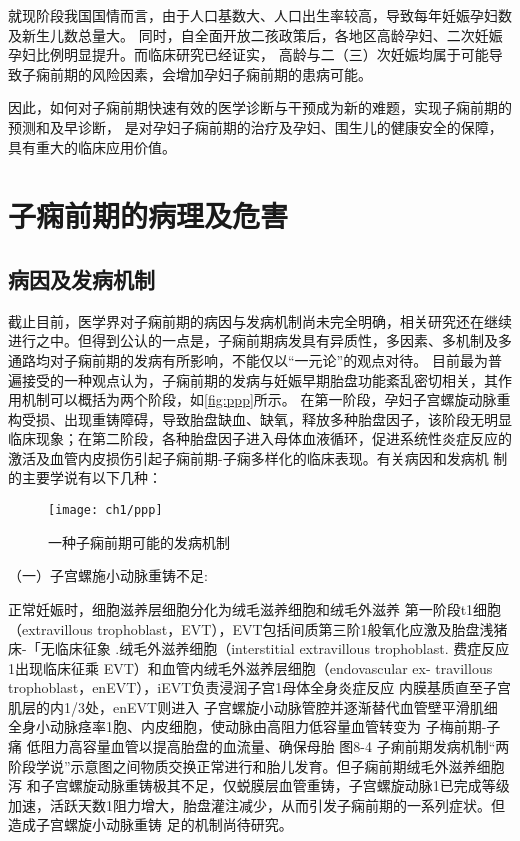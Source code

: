 就现阶段我国国情而言，由于人口基数大、人口出生率较高，导致每年妊娠孕妇数及新生儿数总量大。
同时，自全面开放二孩政策后，各地区高龄孕妇、二次妊娠孕妇比例明显提升。而临床研究已经证实，
高龄与二（三）次妊娠均属于可能导致子痫前期的风险因素，会增加孕妇子痫前期的患病可能。

因此，如何对子痫前期快速有效的医学诊断与干预成为新的难题，实现子痫前期的预测和及早诊断，
是对孕妇子痫前期的治疗及孕妇、围生儿的健康安全的保障，具有重大的临床应用价值。
\section{子痫前期的病理及危害}
\subsection{病因及发病机制}
截止目前，医学界对子痫前期的病因与发病机制尚未完全明确，相关研究还在继续进行之中。但得到公认的一点是，子痫前期病发具有异质性，多因素、多机制及多通路均对子痫前期的发病有所影响，不能仅以“一元论”的观点对待。
目前最为普遍接受的一种观点认为，子痫前期的发病与妊娠早期胎盘功能紊乱密切相关，其作用机制可以概括为两个阶段，如\autoref{fig:ppp}所示。
在第一阶段，孕妇子宫螺旋动脉重构受损、出现重铸障碍，导致胎盘缺血、缺氧，释放多种胎盘因子，该阶段无明显临床现象；在第二阶段，各种胎盘因子进入母体血液循环，促进系统性炎症反应的激活及血管内皮损伤引起子痫前期-子痫多样化的临床表现。有关病因和发病机
制的主要学说有以下几种：
\begin{figure}[htbp]
    \centering
    \texttt{[image: ch1/ppp]}
    \caption{\label{fig:ppp}一种子痫前期可能的发病机制}
\end{figure}

（一）子宫螺施小动脉重铸不足:

正常妊娠时，细胞滋养层细胞分化为绒毛滋养细胞和绒毛外滋养  第一阶段t1细胞（extravillous trophoblast，EVT），EVT包括间质第三阶1般氧化应激及胎盘浅猪床-「无临床征象
.绒毛外滋养细胞（interstitial extravillous trophoblast.
费症反应
1出现临床征乘
EVT）和血管内绒毛外滋养层细胞（endovascular ex-
travillous trophoblast，enEVT），iEVT负责浸润子宫1母体全身炎症反应
内膜基质直至子宫肌层的内1/3处，enEVT则进入
子宫螺旋小动脉管腔并逐渐替代血管壁平滑肌细
全身小动脉痉率1胞、内皮细胞，使动脉由高阻力低容量血管转变为
子梅前期-子痛
低阻力高容量血管以提高胎盘的血流量、确保母胎 图8-4 子痢前期发病机制“两阶段学说”示意图之间物质交换正常进行和胎儿发育。但子痫前期绒毛外滋养细胞泻
和子宫螺旋动脉重铸极其不足，仅蜕膜层血管重铸，子宫螺旋动脉1已完成等级加速，活跃天数1阻力增大，胎盘灌注减少，从而引发子痫前期的一系列症状。但造成子宫螺旋小动脉重铸 足的机制尚待研究。


